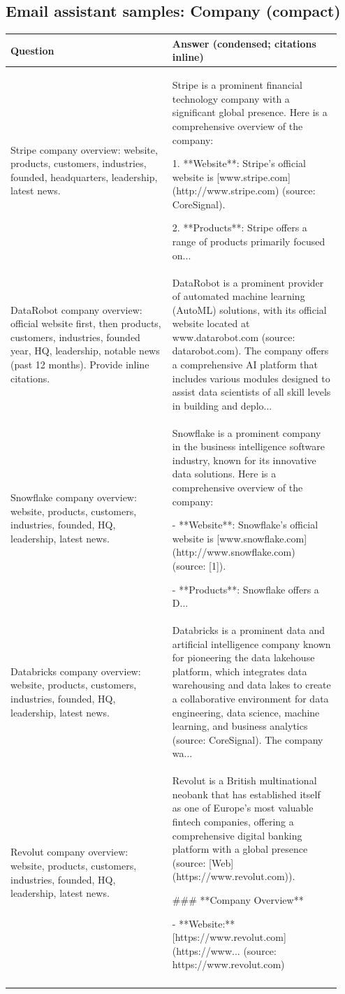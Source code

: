 \subsection*{Email assistant samples: Company (compact)}
\small\sloppy
\begin{longtable}{p{0.46\linewidth} p{0.48\linewidth}}
\toprule
\textbf{Question} & \textbf{Answer (condensed; citations inline)} \\
\midrule
Stripe company overview: website, products, customers, industries, founded, headquarters, leadership, latest news. & Stripe is a prominent financial technology company with a significant global presence. Here is a comprehensive overview of the company:

1. **Website**: Stripe's official website is [www.stripe.com](http://www.stripe.com) (source: CoreSignal).

2. **Products**: Stripe offers a range of products primarily focused on... \\
\addlinespace
DataRobot company overview: official website first, then products, customers, industries, founded year, HQ, leadership, notable news (past 12 months). Provide inline citations. & DataRobot is a prominent provider of automated machine learning (AutoML) solutions, with its official website located at www.datarobot.com (source: datarobot.com). The company offers a comprehensive AI platform that includes various modules designed to assist data scientists of all skill levels in building and deplo... \\
\addlinespace
Snowflake company overview: website, products, customers, industries, founded, HQ, leadership, latest news. & Snowflake is a prominent company in the business intelligence software industry, known for its innovative data solutions. Here is a comprehensive overview of the company:

- **Website**: Snowflake's official website is [www.snowflake.com](http://www.snowflake.com) (source: [1]).

- **Products**: Snowflake offers a D... \\
\addlinespace
Databricks company overview: website, products, customers, industries, founded, HQ, leadership, latest news. & Databricks is a prominent data and artificial intelligence company known for pioneering the data lakehouse platform, which integrates data warehousing and data lakes to create a collaborative environment for data engineering, data science, machine learning, and business analytics (source: CoreSignal). The company wa... \\
\addlinespace
Revolut company overview: website, products, customers, industries, founded, HQ, leadership, latest news. & Revolut is a British multinational neobank that has established itself as one of Europe's most valuable fintech companies, offering a comprehensive digital banking platform with a global presence (source: [Web](https://www.revolut.com)).

### **Company Overview**

- **Website:** [https://www.revolut.com](https://www... (source: https://www.revolut.com) \\
\addlinespace
\bottomrule
\end{longtable}
